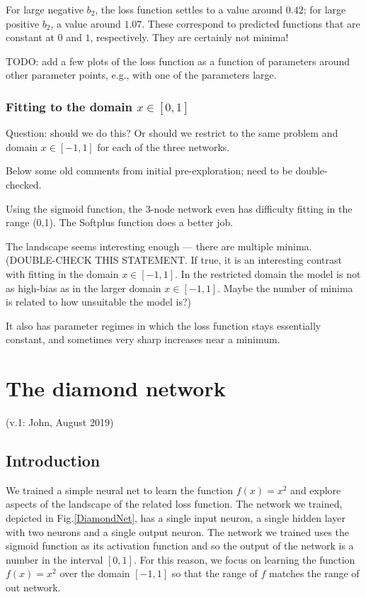 \documentclass[12pt,a4paper]{article}
\begin{document}
For large negative $b_2$, the loss function settles to a value around $0.42$;  for large positive
$b_2$, a value around $1.07$.  These correspond to predicted functions that are constant at $0$ and
$1$, respectively.  They are certainly not minima!   


TODO: add a few plots of the loss function as a function of parameters around other parameter
points, e.g., with one of the parameters large.  



\newpage

\subsubsection{Fitting to the domain $x\in[0,1]$}

Question: should we do this?  Or should we restrict to the same problem and domain  $x\in[-1,1]$ for
each of the three networks.  

Below some old comments from initial pre-exploration; need to be double-checked.

Using the sigmoid function, the 3-node network even has difficulty fitting in the range (0,1).  The Softplus
function does a better job.

The landscape seems interesting enough --- there are multiple minima. (DOUBLE-CHECK THIS STATEMENT.
If true, it is an interesting contrast with fitting in the domain  $x\in[-1,1]$.  In the
restricted domain the model is not as high-bias as in the larger domain  $x\in[-1,1]$.  Maybe the
number of minima is related to how unsuitable the model is?)


It also has parameter regimes in which the loss function stays essentially constant, and sometimes
very sharp increases near a minimum.








\newpage

\section{The diamond network}

(v.1: John, August 2019)

\subsection{Introduction}

We trained a simple neural net to learn the function $f(x)=x^2$ and explore aspects of the landscape of the related loss function. The network we trained, depicted in Fig.\ref{DiamondNet}, has a single input neuron, a single hidden layer with two neurons and a single output neuron. The network we trained uses the sigmoid function as its activation function and so the output of the network is a number in the interval $[0,1]$. For this reason, we focus on learning the function $f(x)=x^2$ over the domain $[-1,1]$ so that the range of $f$ matches the range of out network.
\end{document}
